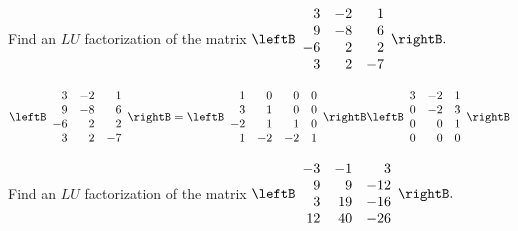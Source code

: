 \begin{enumialphparenastyle}
\begin{ex} Find an $LU$ factorization of the matrix $\leftB 
\begin{array}{rrr}
3 & -2 & 1 \\ 
9 & -8 & 6 \\ 
-6 & 2 & 2 \\ 
3 & 2 & -7
\end{array}
\rightB .$
\begin{sol}
\[
\leftB
\begin{array}{rrr}
3 & -2 & 1 \\
9 & -8 & 6 \\
-6 & 2 & 2 \\
3 & 2 & -7
\end{array}
\rightB = \leftB
\begin{array}{rrrr}
1 & 0 & 0 & 0 \\
3 & 1 & 0 & 0 \\
-2 & 1 & 1 & 0 \\
1 & -2 & -2 & 1
\end{array}
\rightB  \leftB
\begin{array}{rrr}
3 & -2 & 1 \\
0 & -2 & 3 \\
0 & 0 & 1 \\
0 & 0 & 0
\end{array}
\rightB 
\]
\end{sol}
\end{ex}


\begin{ex} Find an $LU$ factorization of the matrix $\leftB 
\begin{array}{rrr}
-3 & -1 & 3 \\ 
9 & 9 & -12 \\ 
3 & 19 & -16 \\ 
12 & 40 & -26
\end{array}
\rightB .$
\end{ex}


\end{enumialphparenastyle}
